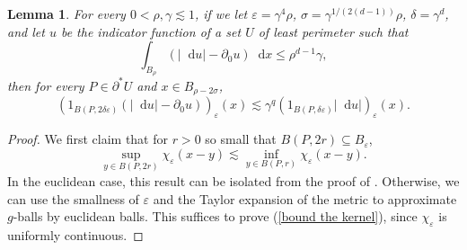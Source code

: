 \documentclass[reqno,11pt]{amsart}
\newcommand*\dif{\mathop{}\!\mathrm{d}}
\newtheorem{lemma}[theorem]{Lemma}
\theoremstyle{definition}
\numberwithin{equation}{section}
\begin{document}
\begin{lemma}\label{mollifier sublemma}
For every $0 < \rho, \gamma \lesssim 1$, if we let $\varepsilon = \gamma^4 \rho$, $\sigma = \gamma^{1/(2(d - 1))} \rho$, $\delta = \gamma^d$, and let $u$ be the indicator function of a set $U$ of least perimeter such that
\begin{equation}\label{hypothesis on mollifier sublemma}
\int_{B_\rho} (|\dif u| - \partial_0 u) \dif x \leq \rho^{d - 1} \gamma,
\end{equation}
then for every $P \in \partial^* U$ and $x \in B_{\rho - 2\sigma}$,
$$(1_{B(P, 2\delta\varepsilon)}(|\dif u| - \partial_0 u))_\varepsilon(x) \lesssim \gamma^q (1_{B(P, \delta\varepsilon)} |\dif u|)_\varepsilon(x).$$
\end{lemma}
\begin{proof}
We first claim that for $r > 0$ so small that $B(P, 2r) \subseteq B_\varepsilon$,
\begin{equation}\label{bound the kernel}
\sup_{y \in B(P, 2r)} \chi_\varepsilon(x - y) \lesssim \inf_{y \in B(P, r)} \chi_\varepsilon(x - y).
\end{equation}
In the euclidean case, this result can be isolated from the proof of \cite[Theorem 7.3]{Giusti77}.
Otherwise, we can use the smallness of $\varepsilon$ and the Taylor expansion of the metric to approximate $g$-balls by euclidean balls.
This suffices to prove (\ref{bound the kernel}), since $\chi_\varepsilon$ is uniformly continuous.


\end{proof}
\end{document}
